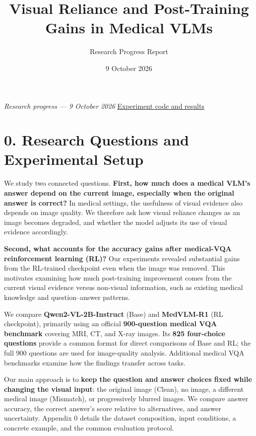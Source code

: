 \documentclass[
  10pt,
  a4paper,
]{article}
\title{Visual Reliance and Post-Training Gains in Medical VLMs}
\author{Research Progress Report}
\date{9 October 2026}
\begin{document}
\maketitle

\renewcommand*\contentsname{Contents}
{
\setcounter{tocdepth}{3}
\tableofcontents
\clearpage
}
\emph{Research progress --- 9 October 2026}
\href{https://github.com/bbuller591-sketch/medical-vlm-visual-reliance}{Experiment
code and results}

\section{0. Research Questions and Experimental
Setup}\label{research-questions-and-experimental-setup}

We study two connected questions. \textbf{First, how much does a medical
VLM's answer depend on the current image, especially when the original
answer is correct?} In medical settings, the usefulness of visual
evidence also depends on image quality. We therefore ask how visual
reliance changes as an image becomes degraded, and whether the model
adjusts its use of visual evidence accordingly.

\textbf{Second, what accounts for the accuracy gains after medical-VQA
reinforcement learning (RL)?} Our experiments revealed substantial gains
from the RL-trained checkpoint even when the image was removed. This
motivates examining how much post-training improvement comes from the
current visual evidence versus non-visual information, such as existing
medical knowledge and question--answer patterns.

We compare \textbf{Qwen2-VL-2B-Instruct} (Base) and \textbf{MedVLM-R1}
(RL checkpoint), primarily using an official \textbf{900-question
medical VQA benchmark} covering MRI, CT, and X-ray images. Its
\textbf{825 four-choice questions} provide a common format for direct
comparisons of Base and RL; the full 900 questions are used for
image-quality analysis. Additional medical VQA benchmarks examine how
the findings transfer across tasks.

Our main approach is to \textbf{keep the question and answer choices
fixed while changing the visual input}: the original image (Clean), no
image, a different medical image (Mismatch), or progressively blurred
images. We compare answer accuracy, the correct answer's score relative
to alternatives, and answer uncertainty. Appendix 0 details the dataset
composition, input conditions, a concrete example, and the common
evaluation protocol.
\end{document}
